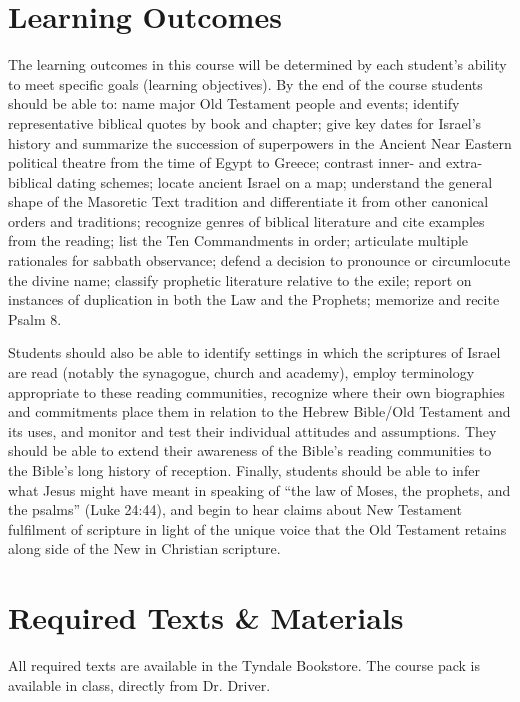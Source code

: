 \documentclass[titlepage]{article}
\newcommand\path{../../syllabus}
\begin{document}


\section{Learning Outcomes}
\label{outcomes}

The learning outcomes in this course will be determined by each
student's ability to meet specific goals (learning objectives). By the
end of the course students should be able to:
  name major Old Testament people and events;
  identify representative biblical quotes by book and chapter;
  give key dates for Israel's history and summarize the succession of
    superpowers in the Ancient Near Eastern political theatre from the
    time of Egypt to Greece;
  contrast inner- and extra-biblical dating schemes;
  locate ancient Israel on a map;
  understand the general shape of the Masoretic Text tradition and
    differentiate it from other canonical orders and traditions;
  recognize genres of biblical literature and cite examples from the
    reading;
  list the Ten Commandments in order;
  articulate multiple rationales for sabbath observance;
  defend a decision to pronounce or circumlocute the divine name;
  classify prophetic literature relative to the exile;
  report on instances of duplication in both the Law and the Prophets;
  memorize and recite Psalm 8.

Students should also be able to identify settings in which the
scriptures of Israel are read (notably the synagogue, church and
academy), employ terminology appropriate to these reading communities,
recognize where their own biographies and commitments place them in
relation to the Hebrew Bible/Old Testament and its uses, and monitor and
test their individual attitudes and assumptions. They should be able
to extend their awareness of the Bible's reading communities to the
Bible's long history of reception. Finally, students should be able to
infer what Jesus might have meant in speaking of ``the law of Moses, the
prophets, and the psalms'' (Luke 24:44), and begin to hear claims about
New Testament fulfilment of scripture in light of the unique voice that
the Old Testament retains along side of the New in Christian scripture.

\section{Required Texts \& Materials}
\label{texts}

All required texts are available in the Tyndale Bookstore. The course
pack is available in class, directly from Dr. Driver.
\end{document}
